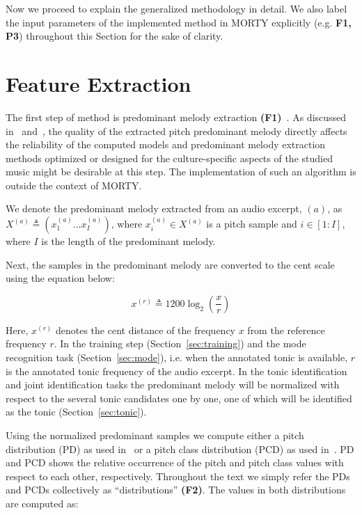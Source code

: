 \documentclass{sig-alternate}
\begin{document}
Now we proceed to explain the generalized methodology in detail. We also label the input parameters of the implemented method in MORTY explicitly (e.g. {\bf F1, P3}) throughout this Section for the sake of clarity.

\section{Feature Extraction}\label{sec:feature}
The first step of method is predominant melody extraction {\bf(F1)}~\cite{chordia, bozkurt_makam, bozkurt_tonic}. As discussed in~\cite{bozkurt_tonic} and~\cite{atli2014makamFeature_atmm}, the quality of the extracted pitch predominant melody directly affects the reliability of the computed models and predominant melody extraction methods optimized or designed for the culture-specific aspects of the studied music might be desirable at this step. The implementation of such an algorithm is outside the context of MORTY. 

We denote the predominant melody extracted from an audio excerpt, $(a)$, as $X^{(a)}  \triangleq \left(x^{(a)}_1 \dots x^{(a)}_I\right)$, where $x^{(a)}_i \in  X^{(a)}$ is a pitch sample and $i \in [1: I]$, where $I$ is the length of the predominant melody. 

Next, the samples in the predominant melody are converted to the cent scale using the equation below:

\begin{equation}
\label{eq:cent_norm}
x^{(r)}  \triangleq 1200 \log_2\left(\frac{x}{r}\right)
\end{equation}

Here, $x^{(r)}$ denotes the cent distance of the frequency $x$ from the reference frequency $r$. In the training step (Section~\ref{sec:training}) and the mode recognition task (Section~\ref{sec:mode}), i.e. when the annotated tonic is available, $r$ is the annotated tonic frequency of the audio excerpt. In the tonic identification and joint identification tasks the predominant melody will be normalized with respect to the several tonic candidates one by one, one of which will be identified as the tonic (Section~\ref{sec:tonic}).

Using the normalized predominant samples we compute either a pitch distribution (PD) as used in~\cite{bozkurt_makam} or a pitch class distribution (PCD) as used in~\cite{chordia}. PD and PCD shows the relative occurrence of the pitch and pitch class values with respect to each other, respectively. Throughout the text we simply refer the PDs and PCDs collectively as ``distributions'' {\bf (F2)}. The values in both distributions are computed as:
\end{document}
